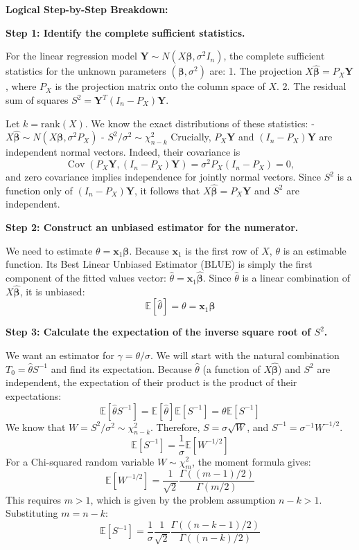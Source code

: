 \begin{solution}
\textbf{Logical Step-by-Step Breakdown:}

\textbf{Step 1: Identify the complete sufficient statistics.}

For the linear regression model $\mathbf{Y} \sim N(X\boldsymbol{\beta}, \sigma^2 I_n)$, the complete sufficient statistics for the unknown parameters $(\boldsymbol{\beta}, \sigma^2)$ are:
1. The projection $X\hat{\boldsymbol{\beta}} = P_X \mathbf{Y}$, where $P_X$ is the projection matrix onto the column space of $X$.
2. The residual sum of squares $S^2 = \mathbf{Y}^T (I_n - P_X) \mathbf{Y}$.

Let $k = \mathrm{rank}(X)$. We know the exact distributions of these statistics:
- $X\hat{\boldsymbol{\beta}} \sim N(X\boldsymbol{\beta}, \sigma^2 P_X)$
- $S^2/\sigma^2 \sim \chi^2_{n-k}$
Crucially, $P_X\mathbf{Y}$ and $(I_n-P_X)\mathbf{Y}$ are independent normal vectors. Indeed, their covariance is
\[
\operatorname{Cov}(P_X\mathbf{Y},(I_n-P_X)\mathbf{Y})
=\sigma^2P_X(I_n-P_X)=0,
\]
and zero covariance implies independence for jointly normal vectors. Since $S^2$ is a function only of $(I_n-P_X)\mathbf{Y}$, it follows that $X\hat{\boldsymbol{\beta}}=P_X\mathbf{Y}$ and $S^2$ are independent.

\textbf{Step 2: Construct an unbiased estimator for the numerator.}

We need to estimate $\theta = \mathbf{x}_1 \boldsymbol{\beta}$. Because $\mathbf{x}_1$ is the first row of $X$, $\theta$ is an estimable function.
Its Best Linear Unbiased Estimator (BLUE) is simply the first component of the fitted values vector: $\hat{\theta} = \mathbf{x}_1 \hat{\boldsymbol{\beta}}$.
Since $\hat{\theta}$ is a linear combination of $X\hat{\boldsymbol{\beta}}$, it is unbiased:
\[ \mathbb{E}[\hat{\theta}] = \theta = \mathbf{x}_1 \boldsymbol{\beta} \]

\textbf{Step 3: Calculate the expectation of the inverse square root of $S^2$.}

We want an estimator for $\gamma = \theta / \sigma$. We will start with the natural combination $T_0 = \hat{\theta} S^{-1}$ and find its expectation.
Because $\hat{\theta}$ (a function of $X\hat{\boldsymbol{\beta}}$) and $S^2$ are independent, the expectation of their product is the product of their expectations:
\[ \mathbb{E}[\hat{\theta} S^{-1}] = \mathbb{E}[\hat{\theta}] \mathbb{E}[S^{-1}] = \theta \mathbb{E}[S^{-1}] \]
We know that $W = S^2 / \sigma^2 \sim \chi^2_{n-k}$. Therefore, $S = \sigma \sqrt{W}$, and $S^{-1} = \sigma^{-1} W^{-1/2}$.
\[ \mathbb{E}[S^{-1}] = \frac{1}{\sigma} \mathbb{E}[W^{-1/2}] \]
For a Chi-squared random variable $W \sim \chi^2_m$, the moment formula gives:
\[ \mathbb{E}[W^{-1/2}] = \frac{1}{\sqrt{2}} \frac{\Gamma((m-1)/2)}{\Gamma(m/2)} \]
This requires $m > 1$, which is given by the problem assumption $n-k > 1$.
Substituting $m = n-k$:
\[ \mathbb{E}[S^{-1}] = \frac{1}{\sigma} \frac{1}{\sqrt{2}} \frac{\Gamma((n-k-1)/2)}{\Gamma((n-k)/2)} \]


\end{solution}
